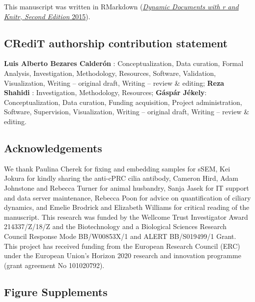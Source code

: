 \documentclass[
]{article}
\begin{document}
This manuscript was written in RMarkdown
(\protect\hyperlink{ref-dynamic2015}{\emph{Dynamic Documents with r and
Knitr, Second Edition} 2015}).

\hypertarget{credit-authorship-contribution-statement}{%
\subsection{CRediT authorship contribution
statement}\label{credit-authorship-contribution-statement}}

\textbf{Luis Alberto Bezares Calderón} : Conceptualization, Data
curation, Formal Analysis, Investigation, Methodology, Resources,
Software, Validation, Visualization, Writing -- original draft, Writing
-- review \& editing; \textbf{Reza Shahidi} : Investigation,
Methodology, Resources; \textbf{Gáspár Jékely}: Conceptualization, Data
curation, Funding acquisition, Project administration, Software,
Supervision, Visualization, Writing -- original draft, Writing -- review
\& editing.

\hypertarget{acknowledgements}{%
\subsection{Acknowledgements}\label{acknowledgements}}

We thank Paulina Cherek for fixing and embedding samples for sSEM, Kei
Jokura for kindly sharing the anti-cPRC cilia antibody, Cameron Hird,
Adam Johnstone and Rebecca Turner for animal husbandry, Sanja Jasek for
IT support and data server maintenance, Rebecca Poon for advice on
quantification of ciliary dynamics, and Emelie Brodrick and Elizabeth
Williams for critical reading of the manuscript. This research was
funded by the Wellcome Trust Investigator Award 214337/Z/18/Z and the
Biotechnology and a Biological Sciences Research Council Response Mode
BB/W00853X/1 and ALERT BB/S019499/1 Grant. This project has received
funding from the European Research Council (ERC) under the European
Union's Horizon 2020 research and innovation programme (grant agreement
No 101020792).

\hypertarget{figure-supplements}{%
\subsection{Figure Supplements}\label{figure-supplements}}
\end{document}
